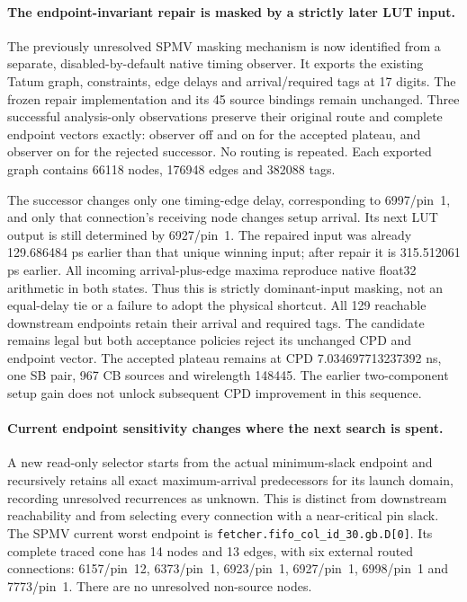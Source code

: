 \paragraph{The endpoint-invariant repair is masked by a strictly later LUT input.}
The previously unresolved SPMV masking mechanism is now identified from a separate, disabled-by-default native timing observer. It exports the existing Tatum graph, constraints, edge delays and arrival/required tags at 17 digits. The frozen repair implementation and its 45 source bindings remain unchanged. Three successful analysis-only observations preserve their original route and complete endpoint vectors exactly: observer off and on for the accepted plateau, and observer on for the rejected successor. No routing is repeated. Each exported graph contains 66118 nodes, 176948 edges and 382088 tags.

The successor changes only one timing-edge delay, corresponding to 6997/pin~1, and only that connection's receiving node changes setup arrival. Its next LUT output is still determined by 6927/pin~1. The repaired input was already 129.686484 ps earlier than that unique winning input; after repair it is 315.512061 ps earlier. All incoming arrival-plus-edge maxima reproduce native float32 arithmetic in both states. Thus this is strictly dominant-input masking, not an equal-delay tie or a failure to adopt the physical shortcut. All 129 reachable downstream endpoints retain their arrival and required tags. The candidate remains legal but both acceptance policies reject its unchanged CPD and endpoint vector. The accepted plateau remains at CPD 7.034697713237392 ns, one SB pair, 967 CB sources and wirelength 148445. The earlier two-component setup gain does not unlock subsequent CPD improvement in this sequence.

\paragraph{Current endpoint sensitivity changes where the next search is spent.}
A new read-only selector starts from the actual minimum-slack endpoint and recursively retains all exact maximum-arrival predecessors for its launch domain, recording unresolved recurrences as unknown. This is distinct from downstream reachability and from selecting every connection with a near-critical pin slack. The SPMV current worst endpoint is \texttt{fetcher.fifo\_col\_id\_30.gb.D[0]}. Its complete traced cone has 14 nodes and 13 edges, with six external routed connections: 6157/pin~12, 6373/pin~1, 6923/pin~1, 6927/pin~1, 6998/pin~1 and 7773/pin~1. There are no unresolved non-source nodes.

